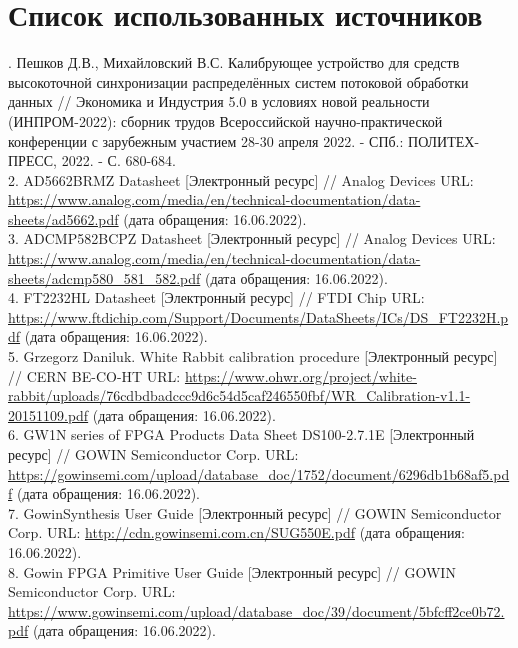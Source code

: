 \clearpage                                  %
\chapter*{Список использованных источников}
\label{references}
\printbibliography[env=SSTfirst] 
. Пешков Д.В., Михайловский В.С. Калибрующее устройство для средств высокоточной синхронизации распределённых систем потоковой обработки данных // Экономика и Индустрия 5.0 в условиях новой реальности (ИНПРОМ-2022): сборник трудов Всероссийской научно-практической конференции с зарубежным участием 28-30 апреля 2022. - СПб.: ПОЛИТЕХ-ПРЕСС, 2022. - С. 680-684.\\
2. AD5662BRMZ Datasheet [Электронный ресурс] // Analog Devices URL: \url{https://www.analog.com/media/en/technical-documentation/data-sheets/ad5662.pdf} (дата обращения: 16.06.2022).\\
3. ADCMP582BCPZ Datasheet [Электронный ресурс] // Analog Devices URL: \url{https://www.analog.com/media/en/technical-documentation/data-sheets/adcmp580\_581\_582.pdf} (дата обращения: 16.06.2022).\\
4. FT2232HL Datasheet [Электронный ресурс] // FTDI Chip URL: \url{https://www.ftdichip.com/Support/Documents/DataSheets/ICs/DS\_FT2232H.pdf} (дата обращения: 16.06.2022).\\
5. Grzegorz Daniluk. White Rabbit calibration procedure [Электронный ресурс] // CERN BE-CO-HT URL: \url{https://www.ohwr.org/project/white-rabbit/uploads/76cdbdbadccc9d6c54d5caf246550fbf/WR\_Calibration-v1.1-20151109.pdf} (дата обращения: 16.06.2022).\\
6. GW1N series of FPGA Products Data Sheet DS100-2.7.1E [Электронный ресурс] // GOWIN Semiconductor Corp. URL: \url{https://gowinsemi.com/upload/database\_doc/1752/document/6296db1b68af5.pdf} (дата обращения: 16.06.2022).\\
7. GowinSynthesis User Guide [Электронный ресурс] // GOWIN Semiconductor Corp. URL: \url{http://cdn.gowinsemi.com.cn/SUG550E.pdf} (дата обращения: 16.06.2022).\\
8. Gowin FPGA Primitive User Guide [Электронный ресурс] // GOWIN Semiconductor Corp. URL: \url{https://www.gowinsemi.com/upload/database\_doc/39/document/5bfcff2ce0b72.pdf} (дата обращения: 16.06.2022).\\
